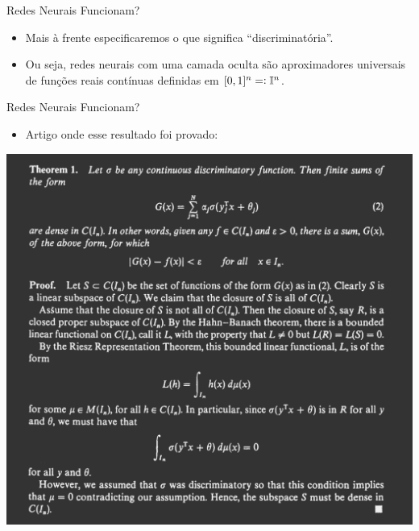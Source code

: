 \documentclass[13pt]{beamer}
\begin{document}
\begin{frame}{Redes Neurais Funcionam?}
    \begin{itemize}
        \item<1-> Mais à frente especificaremos o que significa ``discriminatória''.
        \item<2-> Ou seja, redes neurais com uma camada oculta são aproximadores universais de funções reais contínuas definidas em \( [0, 1]^{ n } = \vcentcolon \mathbb{I}^{ n } \).
    \end{itemize}
\end{frame}

\begin{frame}{Redes Neurais Funcionam?}
    \begin{itemize}
        \item<1-> Artigo onde esse resultado foi provado: \cite{cybenko89}
    \end{itemize}
    \begin{center}
        \includegraphics[width=.7\textwidth]{../figuras/cybenko.png}
    \end{center}
\end{frame}

\end{document}
